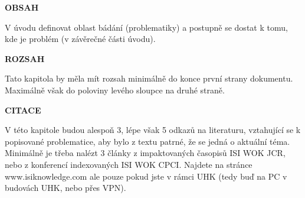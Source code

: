 \documentclass[conference]{IEEEtran}
\begin{document}
\textbf{OBSAH}

V úvodu definovat oblast bádání (problematiky) a postupně se dostat k tomu, kde je problém (v závěrečné části úvodu).

\textbf{ROZSAH}

Tato kapitola by měla mít rozsah minimálně do konce první strany dokumentu. Maximálně však do poloviny levého sloupce na druhé straně.

\textbf{CITACE}

V této kapitole budou alespoň 3, lépe však 5 odkazů na literaturu, vztahující se k popisované problematice, aby bylo z textu patrné, že se jedná o aktuální téma.
Minimálně je třeba nalézt 3 články z impaktovaných časopisů ISI WOK JCR, nebo z konferencí indexovaných ISI WOK CPCI. Najdete na stránce www.isiknowledge.com ale pouze pokud jste v rámci UHK (tedy buď na PC v budovách UHK, nebo přes VPN).


%
%

\end{document}
